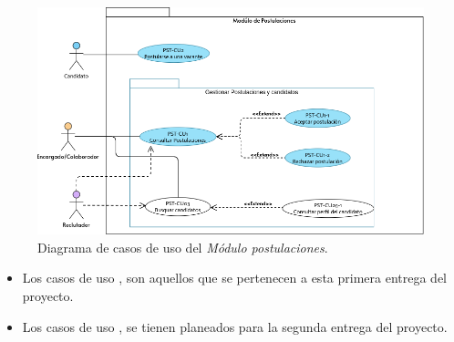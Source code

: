 	\begin{figure}[hbtp!]
		\begin{center}
			\includegraphics[width=.8\textwidth]{sprints/imagenes/DCUPST.png}
		\end{center}
		
		\caption{Diagrama de casos de uso del \textit{Módulo postulaciones}.}
		\label{adcu:usr}
	\end{figure}

	\begin{itemize}
        \item Los casos de uso \IUazul{} , son aquellos que se pertenecen a esta primera entrega del proyecto.
        \item Los casos de uso \IUblanco{}, se tienen planeados para la segunda entrega del proyecto.
    \end{itemize} 

	
	

	
	